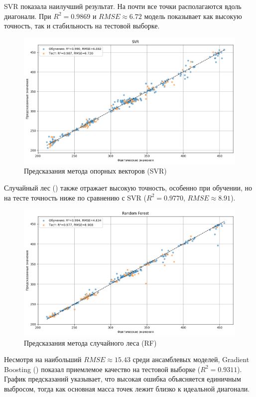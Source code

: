 SVR показала наилучший результат. На  почти все точки располагаются вдоль диагонали. При $R^2 = 0.9869$ и $RMSE \approx 6.72$ модель показывает как высокую точность, так и стабильность на тестовой выборке.

\begin{figure}[htbp!]
	\centering
	\includegraphics[width=.9\linewidth]{my_folder/images/droplet_size/SVR.png}
	\caption{Предсказания метода опорных векторов (SVR)} 
	\label{fig:droplet-size-svr}  
\end{figure}

Случайный лес () также отражает высокую точность, особенно при обучении, но на тесте точность ниже по сравнению с SVR ($R^2 = 0.9770$, $RMSE \approx 8.91$).

\begin{figure}[htbp!]
	\centering
	\includegraphics[width=.9\linewidth]{my_folder/images/droplet_size/Random-Forest.png}
	\caption{Предсказания метода случайного леса (RF)} 
	\label{fig:droplet-size-rf}  
\end{figure}

Несмотря на наибольший $RMSE \approx 15.43$ среди ансамблевых моделей, Gradient Boosting () показал приемлемое качество на тестовой выборке ($R^2 = 0.9311$). График предсказаний указывает, что высокая ошибка объясняется единичным выбросом, тогда как основная масса точек лежит близко к идеальной диагонали.

